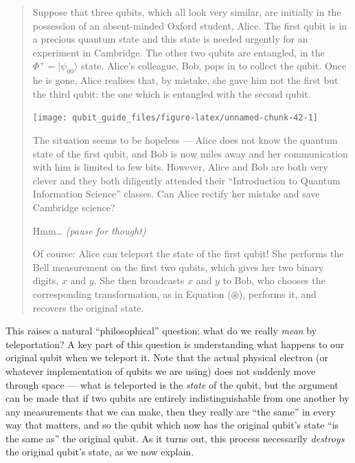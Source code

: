 \documentclass[fleqn,a4paper]{article}
\theoremstyle{definition}
\theoremstyle{definition}
\theoremstyle{definition}
\theoremstyle{definition}
\theoremstyle{remark}
\begin{document}
\begin{quote}
Suppose that three qubits, which all look very similar, are initially in the possession of an absent-minded Oxford student, Alice.
The first qubit is in a precious quantum state and this state is needed urgently for an experiment in Cambridge.
The other two qubits are entangled, in the \(\Phi^+=|\psi_{00}\rangle\) state. Alice's colleague, Bob, pops in to collect the qubit.
Once he is gone, Alice realises that, by mistake, she gave him not the first but the third qubit: the one which is entangled with the second qubit.

\begin{center}\texttt{[image: qubit\_guide\_files/figure-latex/unnamed-chunk-42-1]} \end{center}

The situation seems to be hopeless --- Alice does not know the quantum state of the first qubit, and Bob is now miles away and her communication with him is limited to few bits.
However, Alice and Bob are both very clever and they both diligently attended their ``Introduction to Quantum Information Science'' classes.
Can Alice rectify her mistake and save Cambridge science?

Hmm\ldots{} \emph{(pause for thought)}

Of course: Alice can teleport the state of the first qubit!
She performs the Bell measurement on the first two qubits, which gives her two binary digits, \(x\) and \(y\).
She then broadcasts \(x\) and \(y\) to Bob, who chooses the corresponding transformation, as in Equation (\(\circledast\)), performs it, and recovers the original state.
\end{quote}

This raises a natural ``philosophical'' question: what do we really \emph{mean} by teleportation?
A key part of this question is understanding what happens to our original qubit when we teleport it.
Note that the actual physical electron (or whatever implementation of qubits we are using) does not suddenly move through space --- what is teleported is the \emph{state} of the qubit, but the argument can be made that if two qubits are entirely indistinguishable from one another by any measurements that we can make, then they really are ``the same'' in every way that matters, and so the qubit which now has the original qubit's state ``is the same as'' the original qubit.
As it turns out, this process necessarily \emph{destroys} the original qubit's state, as we now explain.
\end{document}
